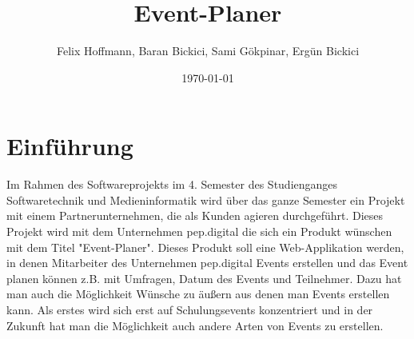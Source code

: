 \documentclass[a4paper,12pt]{article}
\begin{document}

\title{Event-Planer}
\author{Felix Hoffmann, Baran Bickici, Sami Gökpinar, Ergün Bickici}
\date{\today}
\maketitle



\newpage


\tableofcontents

\newpage

\listoffigures

\newpage

\listoftables

\newpage


\section{Einführung}
Im Rahmen des Softwareprojekts im 4. Semester des Studienganges Softwaretechnik und Medieninformatik wird über das ganze Semester ein Projekt mit einem Partnerunternehmen, die als Kunden agieren durchgeführt. Dieses Projekt wird mit dem Unternehmen pep.digital die sich ein Produkt wünschen mit dem Titel "Event-Planer". Dieses Produkt soll eine Web-Applikation werden, in denen Mitarbeiter des Unternehmen pep.digital Events erstellen und das Event planen können z.B. mit Umfragen, Datum des Events und Teilnehmer. Dazu hat man auch die Möglichkeit Wünsche zu äußern aus denen man Events erstellen kann. Als erstes wird sich erst auf Schulungsevents konzentriert und in der Zukunft hat man die Möglichkeit auch andere Arten von Events zu erstellen.
\end{document}
